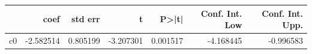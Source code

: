\begin{tabular}{lrrrrrr}
\toprule
 & coef & std err & t & P>|t| & Conf. Int. Low & Conf. Int. Upp. \\
\midrule
c0 & -2.582514 & 0.805199 & -3.207301 & 0.001517 & -4.168445 & -0.996583 \\
\bottomrule
\end{tabular}